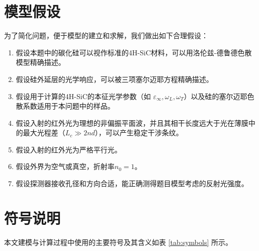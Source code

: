 \documentclass[a4paper]{ctexart}
\begin{document}

\section{模型假设}
为了简化问题，便于模型的建立和求解，我们做出如下合理假设：
\begin{enumerate}
    \item 假设本题中的碳化硅可以视作标准的4H-SiC材料，可以用洛伦兹-德鲁德色散模型精确描述。
    \item 假设硅外延层的光学响应，可以被三项塞尔迈耶方程精确描述。
    \item 假设用于计算的4H-SiC的本征光学参数（如 $\varepsilon_{\infty}, \omega_L, \omega_T$）以及硅的塞尔迈耶色散系数适用于本问题中的样品。
    \item 假设入射的红外光为理想的非偏振平面波，并且其相干长度远大于光在薄膜中的最大光程差（$L_c \gg 2nd$），可以产生稳定干涉条纹。
    \item 假设入射的红外光为严格平行光。
    \item 假设外界为空气或真空，折射率$n_0 = 1$。
    \item 假设探测器接收孔径和方向合适，能正确测得题目模型考虑的反射光强度。
    
    
    
\end{enumerate}

\section{符号说明}
本文建模与计算过程中使用的主要符号及其含义如表 \ref{tab:symbols} 所示。
\end{document}
